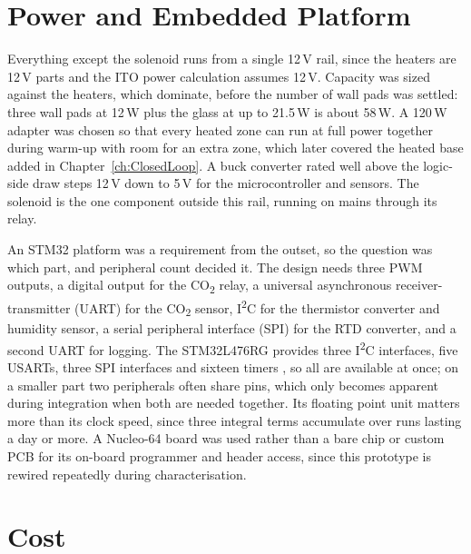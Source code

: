 \section{Power and Embedded Platform}
\label{sec:power-design}

Everything except the solenoid runs from a single 12\,V rail, since the heaters are 12\,V parts and the ITO power calculation assumes 12\,V. Capacity was sized against the heaters, which dominate, before the number of wall pads was settled: three wall pads at 12\,W plus the glass at up to 21.5\,W is about 58\,W. A 120\,W adapter was chosen so that every heated zone can run at full power together during warm-up with room for an extra zone, which later covered the heated base added in Chapter~\ref{ch:ClosedLoop}. A buck converter rated well above the logic-side draw steps 12\,V down to 5\,V for the microcontroller and sensors. The solenoid is the one component outside this rail, running on mains through its relay.

An STM32 platform was a requirement from the outset, so the question was which part, and peripheral count decided it. The design needs three PWM outputs, a digital output for the CO\textsubscript{2} relay, a universal asynchronous receiver-transmitter (UART) for the CO\textsubscript{2} sensor, I\textsuperscript{2}C for the thermistor converter and humidity sensor, a serial peripheral interface (SPI) for the RTD converter, and a second UART for logging. The STM32L476RG provides three I\textsuperscript{2}C interfaces, five USARTs, three SPI interfaces and sixteen timers \citep{st_stm32l476_2019}, so all are available at once; on a smaller part two peripherals often share pins, which only becomes apparent during integration when both are needed together. Its floating point unit matters more than its clock speed, since three integral terms accumulate over runs lasting a day or more. A Nucleo-64 board was used rather than a bare chip or custom PCB for its on-board programmer and header access, since this prototype is rewired repeatedly during characterisation.

\section{Cost}
\label{sec:bom}

